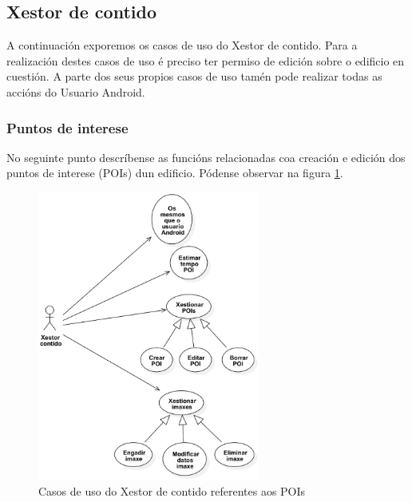 \subsection{Xestor de contido}

A continuación exporemos os casos de uso do Xestor de contido. Para a realización destes casos de uso é preciso ter permiso de edición sobre o edificio en cuestión. A parte dos seus propios casos de uso tamén pode realizar todas as accións do Usuario Android.

\subsubsection{Puntos de interese}
No seguinte punto descríbense as funcións relacionadas coa creación e edición dos puntos de interese (POIs) dun edificio. Pódense observar na figura \ref{fig:cuXestorContidoPOI}.

\begin{figure}[tbp]
	\begin{center}
		\includegraphics[width=0.65\textwidth]{figures/CasosUso/XestorContidoPoi}
		\caption{Casos de uso do Xestor de contido referentes aos POIs}
		\label{fig:cuXestorContidoPOI}
	\end{center}
\end{figure}

